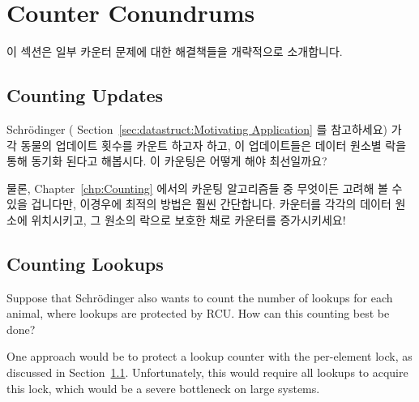 
\section{Counter Conundrums}
\label{sec:together:Counter Conundrums}

이 섹션은 일부 카운터 문제에 대한 해결책들을 개략적으로 소개합니다.
\iffalse

This section outlines possible solutions to some counter conundrums.
\fi

\subsection{Counting Updates}
\label{sec:together:Counting Updates}

Schr\"odinger (
Section~\ref{sec:datastruct:Motivating Application} 를 참고하세요) 가 각 동물의
업데이트 횟수를 카운트 하고자 하고, 이 업데이트들은 데이터 원소별 락을 통해
동기화 된다고 해봅시다.
이 카운팅은 어떻게 해야 최선일까요?

물론,
Chapter~\ref{chp:Counting}
에서의 카운팅 알고리즘들 중 무엇이든 고려해 볼 수 있을 겁니다만, 이경우에
최적의 방법은 훨씬 간단합니다.
카운터를 각각의 데이터 원소에 위치시키고, 그 원소의 락으로 보호한 채로 카운터를
증가시키세요!
\iffalse

Suppose that Schr\"odinger (see
Section~\ref{sec:datastruct:Motivating Application})
wants to count the number of updates for each animal,
and that these updates are synchronized using a per-data-element lock.
How can this counting best be done?

Of course, any number of counting algorithms from
Chapter~\ref{chp:Counting}
might be considered, but the optimal approach is much simpler in this case.
Just place a counter in each data element, and increment it under the
protection of that element's lock!
\fi

\subsection{Counting Lookups}
\label{sec:together:Counting Lookups}

Suppose that Schr\"odinger also wants to count the number of lookups for
each animal, where lookups are protected by RCU.
How can this counting best be done?

One approach would be to protect a lookup counter with the per-element
lock, as discussed in
Section~\ref{sec:together:Counting Updates}.
Unfortunately, this would require all lookups to acquire this lock,
which would be a severe bottleneck on large systems.

